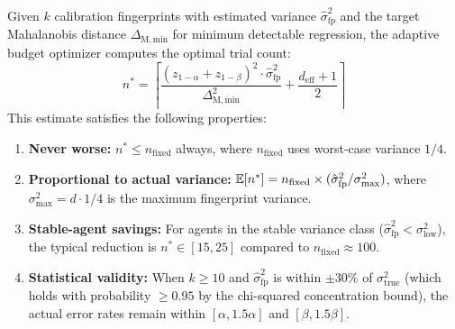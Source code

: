 \begin{theorem}
\label{thm:adaptive-budget}
Given $k$ calibration fingerprints with estimated variance
$\hat{\sigma}^2_{\mathrm{fp}}$ and the target Mahalanobis distance
$\Delta_{\mathrm{M,min}}$ for minimum detectable regression, the
adaptive budget optimizer computes the optimal trial count:
\begin{equation}
\label{eq:adaptive-n}
  n^* = \left\lceil
    \frac{(z_{1-\alpha} + z_{1-\beta})^2 \cdot
      \hat{\sigma}^2_{\mathrm{fp}}}
    {\Delta_{\mathrm{M,min}}^2}
    + \frac{d_{\mathrm{eff}} + 1}{2}
  \right\rceil
\end{equation}
This estimate satisfies the following properties:
\begin{enumerate}[leftmargin=*]
  \item \textbf{Never worse:} $n^* \leq n_{\mathrm{fixed}}$ always,
    where $n_{\mathrm{fixed}}$ uses worst-case variance $1/4$.
  \item \textbf{Proportional to actual variance:}
    $\mathbb{E}[n^*] = n_{\mathrm{fixed}} \times
    (\hat{\sigma}^2_{\mathrm{fp}} / \sigma^2_{\max})$, where
    $\sigma^2_{\max} = d \cdot 1/4$ is the maximum fingerprint variance.
  \item \textbf{Stable-agent savings:} For agents in the stable
    variance class ($\hat{\sigma}^2_{\mathrm{fp}} < \sigma^2_{\text{low}}$),
    the typical reduction is $n^* \in [15, 25]$ compared to
    $n_{\mathrm{fixed}} \approx 100$.
  \item \textbf{Statistical validity:} When $k \geq 10$ and
    $\hat{\sigma}^2_{\mathrm{fp}}$ is within $\pm 30\%$ of
    $\sigma^2_{\mathrm{true}}$ (which holds with probability $\geq
    0.95$ by the chi-squared concentration bound), the actual error
    rates remain within $[\alpha, 1.5\alpha]$ and $[\beta, 1.5\beta]$.
\end{enumerate}
\end{theorem}

